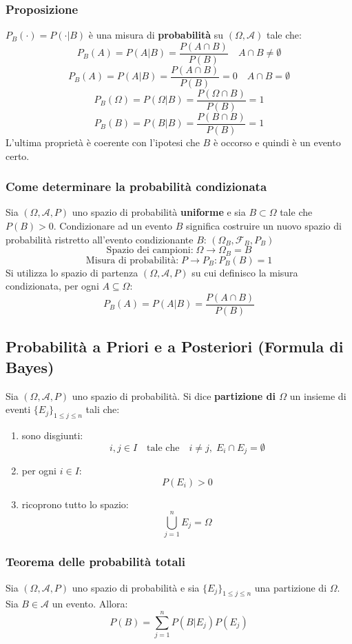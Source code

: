 \documentclass[a4paper]{article}
\theoremstyle{break}
\theoremstyle{break}
\theoremstyle{break}
\theoremstyle{break}
\begin{document}
\subsubsection{Proposizione}
\( P_B(\cdot) = P(\cdot|B) \) è una misura di \textbf{probabilità} su \( (\Omega, \mathcal{A}) \)
tale che:
\[
	P_B(A) = P(A|B) = \frac{P(A \cap B)}{P(B)} \quad A \cap B \neq \emptyset
\]
\[
	P_B(A) = P(A|B) = \frac{P(A \cap B)}{P(B)} = 0 \quad A \cap B = \emptyset
\]
\[
	P_B(\Omega) = P(\Omega|B) = \frac{P(\Omega \cap B)}{P(B)} = 1
\]
\[
	P_B(B) = P(B|B) = \frac{P(B \cap B)}{P(B)} = 1
\]
L'ultima proprietà è coerente con l'ipotesi che \( B \) è occorso e quindi è un evento
certo.

\subsubsection{Come determinare la probabilità condizionata}
Sia \( (\Omega, \mathcal{A}, P) \) uno spazio di probabilità \textbf{uniforme} e sia
\( B \subset \Omega \) tale che \( P(B) > 0 \). Condizionare ad un evento \( B \)
significa costruire un nuovo spazio di probabilità ristretto all'evento condizionante \( B \):
\( (\Omega_B, \mathcal{F}_B, P_B) \)
\[
	\text{Spazio dei campioni:}\; \Omega \to \Omega_B = B
\]
\[
	\text{Misura di probabilità:}\; P \to P_B:P_B(B) = 1
\]
Si utilizza lo spazio di partenza \( (\Omega, \mathcal{A}, P) \) su cui definisco la misura
condizionata, per ogni \( A \subseteq \Omega \):
\[
	P_B(A) = P(A|B) = \frac{P(A \cap B)}{P(B)}
\]

\subsection{Probabilità a Priori e a Posteriori (Formula di Bayes)}
Sia \( (\Omega, \mathcal{A}, P) \) uno spazio di probabilità. Si dice \textbf{partizione
di \( \Omega \)} un insieme di eventi \( \{E_j\}_{1 \le j \le n} \) tali che:
\begin{enumerate}
  \item sono disgiunti:
    \[
      i,j \in I \quad \text{tale che} \quad i \neq j,\; E_i \cap E_j = \emptyset
    \] 
  \item per ogni \( i \in I \):
    \[
    P(E_i) > 0
    \] 
  \item ricoprono tutto lo spazio:
    \[
    \bigcup_{j = 1}^n E_j = \Omega
    \]
\end{enumerate}

\subsubsection{Teorema delle probabilità totali}
Sia \( (\Omega, \mathcal{A}, P) \) uno spazio di probabilità e sia \( \{E_j\}_{1 \le j \le n} \)
una partizione di \( \Omega \). Sia \( B \in \mathcal{A} \) un evento. Allora:
\[
  P(B) = \sum_{j = 1}^n P(B|E_j)P(E_j)
\] 
\end{document}
